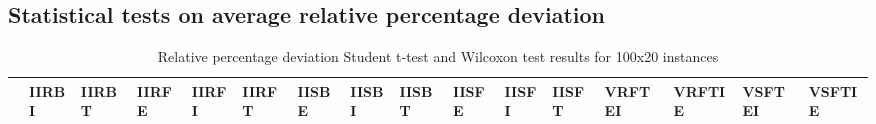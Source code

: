 \documentclass[a4paper,12pt]{article}
\begin{document}
\newpage\cleardoublepage{}
\begin{landscape}
\section{Statistical tests on average relative percentage deviation}
\label{app:stat}
\begin{table}[H]
\begin{center}
\caption{Relative percentage deviation Student t-test and Wilcoxon test results for 100x20 instances}
\label{app:stat/table/dev/100x20}
\tiny
\tabcolsep=0.11cm
\begin{tabular}{|l|l|l|l|l|l|l|l|l|l|l|l|l|l|l|l|}
\hline
& \textbf{IIRBI} & \textbf{IIRBT} & \textbf{IIRFE} & \textbf{IIRFI} & \textbf{IIRFT} & \textbf{IISBE} & \textbf{IISBI} & \textbf{IISBT} & \textbf{IISFE} & \textbf{IISFI} & \textbf{IISFT} & \textbf{VRFTEI} & \textbf{VRFTIE} & \textbf{VSFTEI} & \textbf{VSFTIE}\\
\hline

\end{tabular}
\end{center}
\end{table}
\end{landscape}
\end{document}
